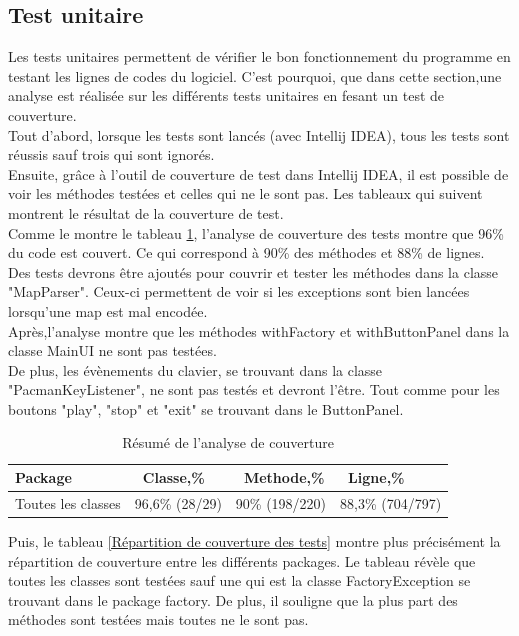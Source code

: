 \documentclass[12pt,a4paper,final]{article}
\begin{document}
\subsection{Test unitaire}
Les tests unitaires permettent de vérifier le bon fonctionnement du programme en testant les lignes de codes du logiciel. C'est pourquoi, que dans cette section,une analyse est réalisée sur les différents tests unitaires en fesant un test de couverture.\\
Tout d'abord, lorsque les tests sont lancés (avec Intellij IDEA), tous les tests sont réussis sauf trois qui sont ignorés.\\
Ensuite, grâce à l'outil de couverture de test dans Intellij IDEA, il est possible de voir les méthodes testées et celles qui ne le sont pas. Les tableaux qui suivent montrent le résultat de la couverture de test.\\
Comme le montre le tableau \ref{Résumé de l'analyse de couverture}, l'analyse de couverture des tests montre que 96\% du code est couvert. Ce qui correspond à 90\% des méthodes et 88\% de lignes.\\
Des tests devrons être ajoutés pour couvrir et tester les méthodes dans la classe "MapParser". Ceux-ci permettent de voir si les exceptions sont bien lancées lorsqu'une map est mal encodée.\\
Après,l'analyse montre que les méthodes withFactory et withButtonPanel dans la classe MainUI ne sont pas testées.\\

De plus, les évènements du clavier, se trouvant dans la classe "PacmanKeyListener", ne sont pas testés et devront l'être. Tout comme pour les boutons "play", "stop" et "exit" se trouvant dans le ButtonPanel.\\ 

\begin{table}[!h]
\begin{tabular}{|l|l|l|l|}
\hline
Package & \ Classe,\% & \ Methode,\% & \ Ligne,\% \\
\hline
Toutes les classes & 96,6\% (28/29) & 90\% (198/220) & 88,3\% (704/797) \\
\hline
\end{tabular}
\caption{Résumé de l'analyse de couverture}
\label{Résumé de l'analyse de couverture}
\end{table}

Puis, le tableau \ref{Répartition de couverture des tests} montre plus précisément la répartition de couverture entre les différents packages.
Le tableau révèle que toutes les classes sont testées sauf une qui est la classe FactoryException se trouvant dans le package factory.
De plus, il souligne que la plus part des méthodes sont testées mais toutes ne le sont pas. 
\end{document}
